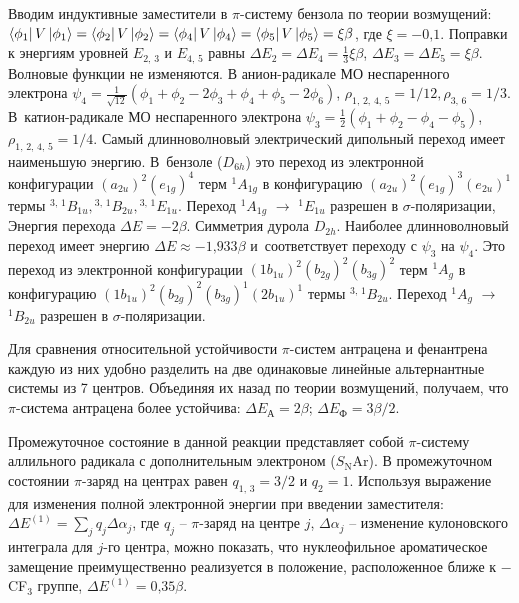  Вводим индуктивные заместители в $\pi$-систему бензола по теории возмущений: $\bra{\phi_1}{V}\ket{\phi_1}=\bra{\phi_2}{V}\ket{\phi_2}=\bra{\phi_4}{V}\ket{\phi_4}=\bra{\phi_5}{V}\ket{\phi_5}=\xi\beta$, где $ \xi=-0\text{,}1$. Поправки к энергиям уровней $E_{2,\,3}$ и $E_{4,\,5}$ равны $\Delta E_2 =\Delta E_4=\frac{1}{3}\xi\beta$, $\Delta E_3=\Delta E_5=\xi\beta$. Волновые функции не изменяются. В анион-радикале МО неспаренного электрона ${\psi_4=\frac{1}{\sqrt{12}}(\phi_1+\phi_2-2\phi_3+\phi_4+\phi_5-2\phi_6)}$, $\rho_{1,\,2,\,4,\,5}=1/12\text{,}\,\rho_{3,\,6}=1/3$. В~катион-радикале МО неспаренного электрона $\psi_3=\frac{1}{2}(\phi_1+\phi_2-\phi_4-\phi_5)$, $\rho_{1,\,2,\,4,\,5}=1/4$. Самый длинноволновый электрический дипольный переход имеет наименьшую энергию. В~бензоле ($D_{6h}$) это переход из электронной конфигурации $(a_{2u})^2(e_{1g})^4$ терм $^1A_{1g}$ в конфигурацию $(a_{2u})^2(e_{1g})^3(e_{2u})^1$ термы $^{3,\,1}B_{1u}\text{,}\,{^{3,\,1}B_{2u}}\text{,}\,{^{3,\,1}E_{1u}}$. Переход $^1A_{1g}$ $\rightarrow$ ${^{1}E_{1u}}$ разрешен в $\sigma$-поляризации, Энергия перехода $\Delta E =-2\beta$. Симметрия дурола $D_{2h}$. Наиболее длинноволновый переход имеет энергию ${\Delta E \approx -1\text{,}933\beta}$ и~соответствует переходу с $\psi_3$ на $\psi_4$. Это переход из электронной конфигурации $(1b_{1u})^2(b_{2g})^2(b_{3g})^2$ терм $^1{A_{g}}$ в конфигурацию $(1b_{1u})^2(b_{2g})^2(b_{3g})^1(2b_{1u})^1$ термы $^{3,\,1}{B_{2u}}$. Переход $^{1}{A_{g}}$ $\rightarrow$ $^{1}{B_{2u}}$ разрешен в $\sigma$-поляризации.
\par
{} Для сравнения относительной устойчивости $\pi$-систем антрацена и фенантрена каждую из них удобно разделить на две одинаковые линейные альтернантные системы из 7 центров. Объединяя их назад по теории возмущений, получаем, что $\pi$-система антрацена более устойчива: $\Delta E_{\textrm{А}}=2\beta$; $\Delta E_{\textrm{Ф}}=3\beta / 2$.\par
{} Промежуточное состояние в данной реакции представляет собой $\pi$-систему аллильного радикала с дополнительным электроном ($S_{\text{N}}\text{Ar}$). В промежуточном состоянии $\pi$-заряд на центрах равен $q_{1,\,3}=3/2$ и $q_{2}=1$. Используя выражение для изменения полной электронной энергии при введении заместителя: $\Delta E^{(1)}=\sum_j q_j\Delta\alpha_j$, где $q_j$ – $\pi$-заряд на центре $j$, $\Delta\alpha_j$ – изменение кулоновского интеграла для $j$-го центра, можно показать, что нуклеофильное ароматическое замещение преимущественно реализуется в положение, расположенное ближе к $-$CF$_3$ группе, $\Delta E^{(1)}=0\text{,}35\beta$.\par
